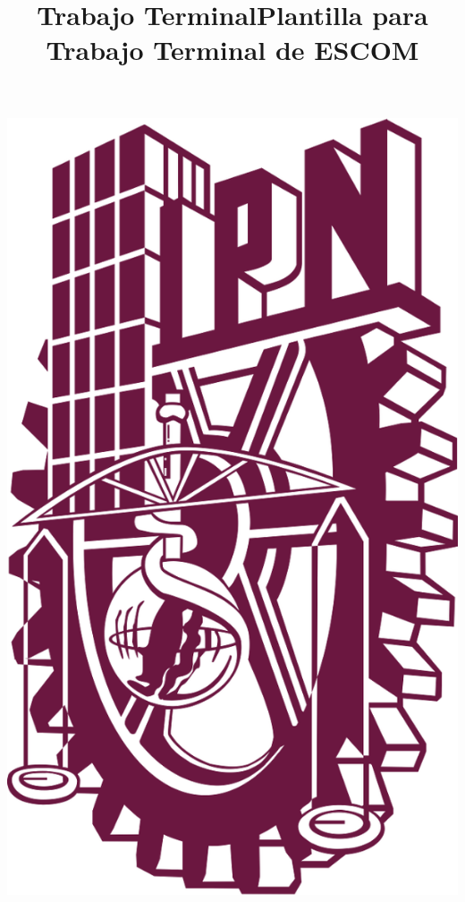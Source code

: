 \documentclass[11pt,letter]{report}
\title{Trabajo Terminal}
\title{Plantilla para Trabajo Terminal de ESCOM}
\begin{document}
\begin{center}
\newcommand{\HRule}{\rule{\linewidth}{0.5mm}}
\begin{minipage}{0.48\textwidth} \begin{flushleft}
\includegraphics[scale = 0.09]{./images/ipn.png}
\end{flushleft}\end{minipage}
\begin{minipage}{0.48\textwidth} \begin{flushright}

\end{flushright}
\end{minipage}
\end{center}
\end{document}
